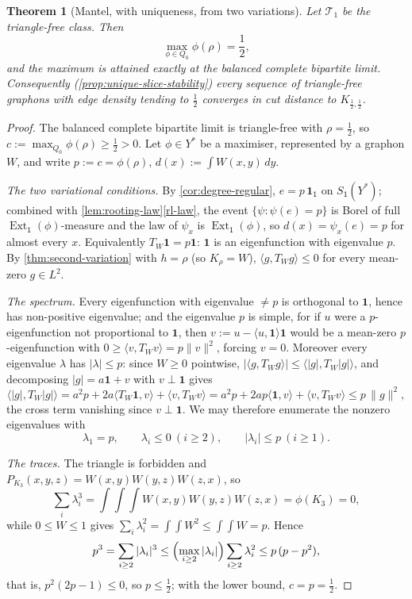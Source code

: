 \documentclass[11pt]{article}
\newtheorem{theorem}{Theorem}
\theoremstyle{definition}
\newcommand{\T}{\mathcal{T}}
\newcommand{\Ext}{\operatorname{Ext}}
\newcommand{\one}{\mathbf 1}
\newcommand{\vtype}{\mathsf{1}}
\begin{document}
\begin{theorem}[Mantel, with uniqueness, from two variations]\label{thm:variational-mantel}
Let $\T_1$ be the triangle-free class.  Then
\[
  \max_{\phi\in Q_0}\phi(\rho)=\frac12,
\]
and the maximum is attained exactly at the balanced complete bipartite limit.
Consequently \textup(\cref{prop:unique-slice-stability}\textup) every sequence of
triangle-free graphons with edge density tending to $\frac12$ converges in cut
distance to $K_{\frac12,\frac12}$.
\end{theorem}

\begin{proof}
The balanced complete bipartite limit is triangle-free with $\rho=\frac12$, so
$c:=\max_{Q_0}\phi(\rho)\ge\frac12>0$.  Let $\phi\in Y^\ast$ be a maximiser,
represented by a graphon $W$, and write $p:=c=\phi(\rho)$, $d(x):=\int W(x,y)\,dy$.

\emph{The two variational conditions.}
By \cref{cor:degree-regular}, $e=p\,\one_\vtype$ on $S_\vtype(Y^\ast)$; combined with
\cref{lem:rooting-law}\ref{rl-law}, the event $\{\psi:\psi(e)=p\}$ is Borel of full
$\Ext_\vtype(\phi)$-measure and the law of $\psi_x$ is $\Ext_\vtype(\phi)$, so
$d(x)=\psi_x(e)=p$ for almost every $x$.  Equivalently $T_W\one=p\one$: $\one$ is an
eigenfunction with eigenvalue $p$.  By \cref{thm:second-variation}
with $h=\rho$ (so $K_\rho=W$), $\langle g,T_Wg\rangle\le0$ for every mean-zero
$g\in L^2$.

\emph{The spectrum.}
Every eigenfunction with eigenvalue $\neq p$ is orthogonal to $\one$, hence has
non-positive eigenvalue; and the eigenvalue $p$ is simple, for if $u$ were a
$p$-eigenfunction not proportional to $\one$, then $v:=u-\langle u,\one\rangle\one$
would be a mean-zero $p$-eigenfunction with
$0\ge\langle v,T_Wv\rangle=p\|v\|^2$, forcing $v=0$.  Moreover every eigenvalue
$\lambda$ has $|\lambda|\le p$: since $W\ge0$ pointwise,
$|\langle g,T_Wg\rangle|\le\langle|g|,T_W|g|\rangle$, and decomposing
$|g|=a\one+v$ with $v\perp\one$ gives
\[
  \langle|g|,T_W|g|\rangle
  =a^2p+2a\langle T_W\one,v\rangle+\langle v,T_Wv\rangle
  =a^2p+2ap\langle\one,v\rangle+\langle v,T_Wv\rangle
  \le p\,\|g\|^2 ,
\]
the cross term vanishing since $v\perp\one$.  We may therefore enumerate the nonzero
eigenvalues with
\[
  \lambda_1=p,\qquad
  \lambda_i\le0\ (i\ge2),\qquad
  |\lambda_i|\le p\ (i\ge1).
\]

\emph{The traces.}
The triangle is forbidden and $P_{K_3}(x,y,z)=W(x,y)W(y,z)W(z,x)$, so
\[
  \sum_i\lambda_i^3=\int\!\!\int\!\!\int W(x,y)W(y,z)W(z,x)=\phi(K_3)=0 ,
\]
while $0\le W\le1$ gives
$\sum_i\lambda_i^2=\int\!\!\int W^2\le\int\!\!\int W=p$.  Hence
\[
  p^3=\sum_{i\ge2}|\lambda_i|^3
  \le\Bigl(\max_{i\ge2}|\lambda_i|\Bigr)\sum_{i\ge2}\lambda_i^2
  \le p\,(p-p^2),
\]
that is, $p^2(2p-1)\le0$, so $p\le\frac12$; with the lower bound, $c=p=\frac12$.


\end{proof}
\end{document}
